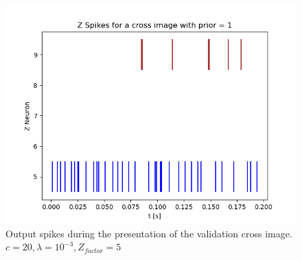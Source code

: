 \begin{figure}
  \includegraphics[width=\linewidth]{figures/horvert/horvert_c20_3_Zfactor5_crossZSpikes.png}
  \caption{Output spikes during the presentation of the validation cross image. $c = 20, \lambda = 10^{-3}, Z_{factor} = 5$}
  \label{fig:horvert_c20_3_Zfactor5_crossZSpikes}
\end{figure}

















